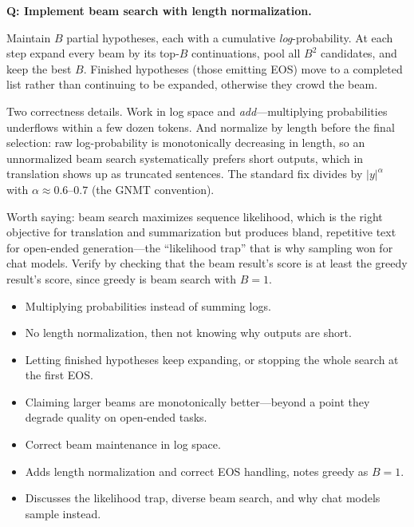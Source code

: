 \begin{interviewq}
\textbf{Q: Implement beam search with length normalization.}

 \quad {} \quad \badgefreq{\freqmed}

\stronganswer

Maintain $B$ partial hypotheses, each with a cumulative \emph{log}-probability. At each step expand every beam by its top-$B$ continuations, pool all $B^2$ candidates, and keep the best $B$. Finished hypotheses (those emitting EOS) move to a completed list rather than continuing to be expanded, otherwise they crowd the beam.

Two correctness details. Work in log space and \emph{add}---multiplying probabilities underflows within a few dozen tokens. And normalize by length before the final selection: raw log-probability is monotonically decreasing in length, so an unnormalized beam search systematically prefers short outputs, which in translation shows up as truncated sentences. The standard fix divides by $|y|^\alpha$ with $\alpha \approx 0.6$--$0.7$ (the GNMT convention).

Worth saying: beam search maximizes sequence likelihood, which is the right objective for translation and summarization but produces bland, repetitive text for open-ended generation---the ``likelihood trap'' that is why sampling won for chat models. Verify by checking that the beam result's score is at least the greedy result's score, since greedy is beam search with $B=1$.

\redflags
\begin{itemize}
    \item Multiplying probabilities instead of summing logs.
    \item No length normalization, then not knowing why outputs are short.
    \item Letting finished hypotheses keep expanding, or stopping the whole search at the first EOS.
    \item Claiming larger beams are monotonically better---beyond a point they degrade quality on open-ended tasks.
\end{itemize}


\goodgreat
\begin{itemize}
    \item {} Correct beam maintenance in log space.
    \item {} Adds length normalization and correct EOS handling, notes greedy as $B=1$.
    \item {} Discusses the likelihood trap, diverse beam search, and why chat models sample instead.
\end{itemize}

\end{interviewq}

